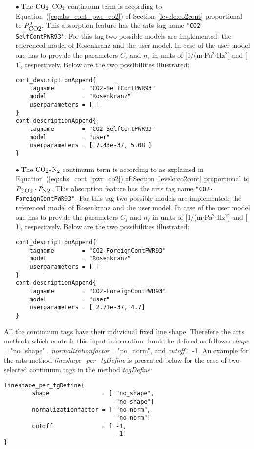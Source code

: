 \begin{itemize}
\item[$\bullet$] The \cite{pwr:93} $\mbox{CO}_2$-$\mbox{CO}_2$ continuum term is
  according to Equation~(\ref{eq:abs_cont_pwr_co2}) of
  Section~\ref{levelc:co2cont} proportional to $P_{\mbox{\rm \small CO2}}^2$. This
  absorption feature has the arts tag name {\tt "CO2-SelfContPWR93"}.
  For this tag two possible models are implemented: the referenced
  model of Rosenkranz and the user model. In case of the user model
  one has to provide the parameters $C_s$ and $n_s$ in units of
  $[$1/(m$\cdot$Pa$^2$$\cdot$Hz$^2$$]$ and $[$1$]$, respectively.
  Below are the two possibilities illustrated:
\begin{verbatim}
cont_descriptionAppend{
    tagname        = "CO2-SelfContPWR93"
    model          = "Rosenkranz"
    userparameters = [ ]
}
cont_descriptionAppend{
    tagname        = "CO2-SelfContPWR93"
    model          = "user"
    userparameters = [ 7.43e-37, 5.08 ]
}
\end{verbatim}

  
\item[$\bullet$] The \cite{pwr:93} $\mbox{CO}_2$-$\mbox{N}_2$ continuum term is
  according to as explained in Equation~(\ref{eq:abs_cont_pwr_co2}) of
  Section \ref{levelc:co2cont} proportional to $P_{\mbox{\rm \small CO2}} \cdot P_{\mbox{\rm \small N2}}$.
  This absorption feature has the arts tag name 
  {\tt"CO2-ForeignContPWR93"}. For this tag two possible models are
  implemented: the referenced model of Rosenkranz and the user model.
  In case of the user model one has to provide the parameters $C_f$
  and $n_f$ in units of $[$1/(m$\cdot$Pa$^2$$\cdot$Hz$^2$$]$ and
  $[$1$]$, respectively.  Below are the two possibilities illustrated:
\begin{verbatim}
cont_descriptionAppend{
    tagname        = "CO2-ForeignContPWR93"
    model          = "Rosenkranz"
    userparameters = [ ]
}
cont_descriptionAppend{
    tagname        = "CO2-ForeignContPWR93"
    model          = "user"
    userparameters = [ 2.71e-37, 4.7]
}
\end{verbatim}
\end{itemize}

All the continuum tags have their individual fixed line shape. 
Therefore the arts methods which controls this input information
should be defined as follows:  {\it shape}\,=\,"no\_shape" , 
{\it normalizationfactor}\,=\,"no\_norm", and {\it cutoff}\,=\,-1. An 
example for the arts method {\it lineshape\_per\_tgDefine} is presented 
below for the case of two selected continuum tags in the method 
{\it tagDefine}:
\begin{verbatim}
lineshape_per_tgDefine{
        shape               = [ "no_shape", 
                                "no_shape"]
        normalizationfactor = [ "no_norm", 
                                "no_norm"]
        cutoff              = [ -1,
                                -1]
}
\end{verbatim}

